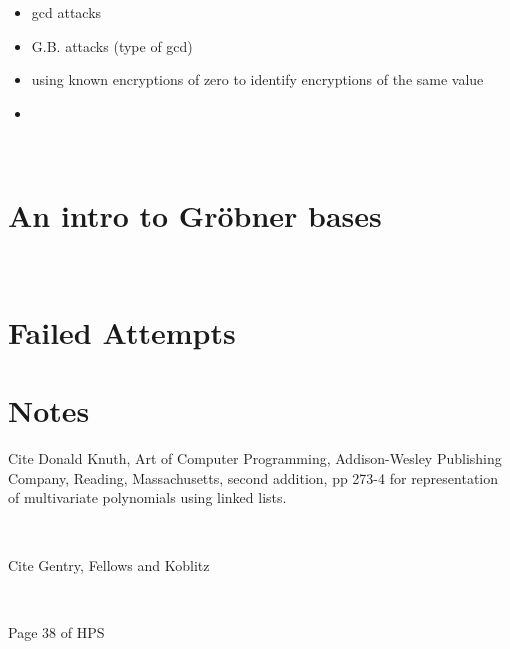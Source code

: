 \documentclass[11pt]{report}
\begin{document}
\begin{itemize}
\item gcd attacks
\item G.B. attacks (type of gcd)
\item using known encryptions of zero to identify encryptions of the same value
\item
\end{itemize}

\

\section{An intro to Gr\"obner bases}

\

\section{Failed Attempts}

\section{Notes}
Cite Donald Knuth, Art of Computer Programming, Addison-Wesley Publishing Company, Reading, Massachusetts, second addition, pp 273-4 for representation of multivariate polynomials using linked lists.

\

Cite Gentry, Fellows and Koblitz

\

Page 38 of HPS
\end{document}
